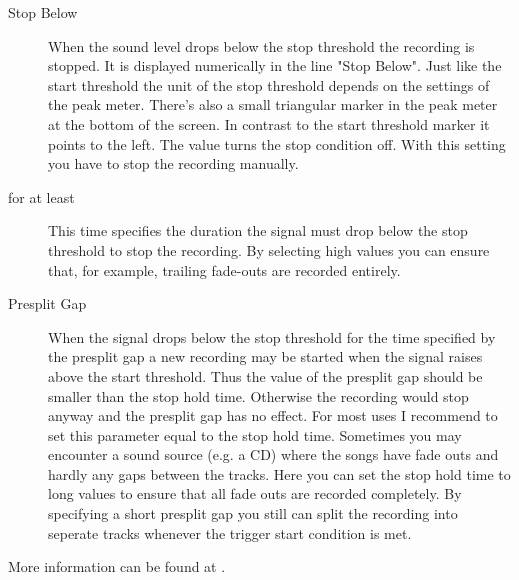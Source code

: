 \begin{description}
  \item[Stop Below]
	When the sound level drops below the stop threshold the recording is stopped.
	It is displayed numerically in the line "Stop Below". Just like the start
	threshold the unit of the stop threshold depends on the settings of the peak
	meter. There's also a small triangular marker in the peak meter at the bottom
	of the screen. In contrast to the start threshold marker it points to the
	left. The value  turns the stop condition off. With this setting you
	have to stop the recording manually.
	
  \item[for at least]
    This time specifies the duration the signal must drop below the stop
	threshold to stop the recording. By selecting high values you can ensure
	that, for example, trailing fade-outs are recorded entirely.
	
  \item[Presplit Gap]
    When the signal drops below the stop threshold for the time specified by the
	presplit gap a new recording may be started when the signal raises above the
	start threshold. Thus the value of the presplit gap should be smaller than
	the stop hold time. Otherwise the recording would stop anyway and the
	presplit gap has no effect. For most uses I recommend to set this parameter
	equal to the stop hold time. Sometimes you may encounter a sound source (e.g.
	a CD) where the songs have fade outs and hardly any gaps between the tracks.
	Here you can set the stop hold time to long values to ensure that all fade
	outs are recorded completely. By specifying a short presplit gap you still
	can split the recording into seperate tracks whenever the trigger start
	condition is met.
	
  \end{description}
  
More information can be found at .
  
